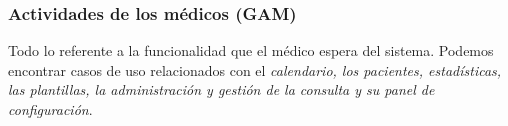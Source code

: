 \documentclass[a4paper,oneside,11pt]{book}
\begin{document}
			
			\newpage
			\subsubsection{Actividades de los médicos (GAM)} %
			\label{sub:actividades_de_los_medicos}
			Todo lo referente a la funcionalidad que el médico espera del sistema. Podemos encontrar casos de uso relacionados con el \textit{calendario, los pacientes, estadísticas, las plantillas, la administración y gestión de la consulta y su panel de configuración}.
				\newline
				\newline
				
\end{document}
